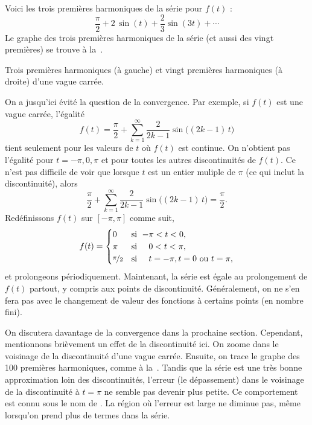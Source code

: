 \begin{example}
Voici les trois premières harmoniques de la série pour  $f(t)$ :
\begin{equation*}
\frac{\pi}{2}
+
2 \, \sin (t)
+
\frac{2}{3}  \sin (3t)
+ \cdots
\end{equation*}
Le graphe des trois premières harmoniques de la série (et aussi des vingt premières) se trouve à la~.

\begin{myfig}
\capstart
\caption{Trois premières harmoniques (à gauche) et vingt premières harmoniques (à droite) d'une vague carrée.\label{ts:squarewavefsfig}}
\end{myfig}
\end{example}

On a jusqu'ici évité la question de la convergence. Par exemple, si  $f(t)$ est une vague carrée, l'égalité 
\begin{equation*}
f(t) = 
\frac{\pi}{2} + \sum_{k=1}^\infty
\frac{2}{2k-1} 
\sin \bigl( (2k-1)\, t \bigr) 
\end{equation*}
tient seulement pour les valeurs de $t$ où $f(t)$ est continue. On n'obtient pas l'égalité pour $t=-\pi,0,\pi$ et pour toutes les autres discontinuités de $f(t)$. Ce n'est pas difficile de voir que lorsque $t$ est un entier muliple de 
$\pi$ (ce qui inclut la discontinuité), alors
\begin{equation*}
\frac{\pi}{2} + \sum_{k=1}^\infty
\frac{2}{2k-1} 
\sin \bigl( (2k-1)\, t \bigr) = \frac{\pi}{2} .
\end{equation*}
Redéfinissons $f(t)$ sur $[-\pi,\pi]$ comme suit,
\begin{equation*}
f(t) =
\begin{cases}
0 & \text{si } \; {-\pi} < t < 0 , \\
\pi & \text{si } \; \phantom{-}0 < t < \pi , \\
\nicefrac{\pi}{2} & \text{si } \; \phantom{-}t = -\pi, 
t = 0\text{ ou }
t = \pi,
\end{cases}
\end{equation*}
et prolongeons périodiquement.  Maintenant, la série est égale au prolongement de $f(t)$ partout, y compris aux points de discontinuité. Généralement, on ne s'en fera pas avec le changement de valeur des fonctions à certains points (en nombre fini). 

On discutera davantage de la convergence dans la prochaine section. Cependant, mentionnons brièvement un effet de la discontinuité ici. On zoome dans le voisinage de la discontinuité d'une vague carrée. Ensuite, on trace le graphe des 100 premières harmoniques, comme à 
la~.  Tandis que la
série est une très bonne approximation loin des discontinuités, l'erreur
(le dépassement) dans le voisinage de la discontinuité à $t=\pi$ ne semble pas devenir plus petite. Ce comportement est connu sous le nom de \emph{}.
La région où l'erreur est large ne diminue pas, même lorsqu'on prend plus de termes dans la série. 

